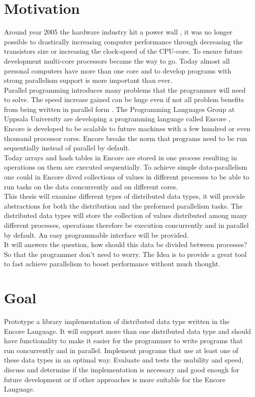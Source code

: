 \section{Motivation}
Around year 2005 the hardware industry hit a power wall \cite{powerwall}, it was no longer possible to drastically increasing computer performance through decreasing the transistors size or increasing the clock-speed of the CPU-core. To ensure future development multi-core processors became the way to go. Today almost all personal computers have more than one core and to develop programs with strong parallelism support is more important than ever.\\

Parallel programming introduces many problems that the programmer will need to solve. The speed increase gained can be huge even if not all problem benefits from being written in parallel form \cite{paralell-computing}. The Programming Languages Group at Uppsala University are developing a programming language called Encore \cite{encore_paper}, Encore is developed to be scalable to future machines with a few hundred or even thousand processor cores. Encore breaks the norm that programs need to be run sequentially instead of parallel by default. \\

Today arrays and hash tables in Encore are stored in one process resulting in operations on them are executed sequentially. To achieve simple data-parallelism \cite{paralell-computing} one could in Encore dived collections of values in different processes to be able to run tasks on the data concurrently and on different cores.\\

This thesis will examine different types of distributed data types, it will provide abstractions for both the distribution and the preformed parallelism tasks. The distributed data types will store the collection of values distributed among many different processes, operations therefore be execution concurrently and in parallel by default. An easy programmable interface will be provided.\\

It will answers the question, how should this data be divided between processes? So that the programmer don’t need to worry. The Idea is to provide a great tool to fast achieve parallelism to boost performance without much thought. \\

\section{Goal}
Prototype a library implementation of distributed data type written in the Encore Language. It will support more than one distributed data type and should have functionality to make it easier for the programmer to write programs that run concurrently and in parallel. Implement programs that use at least one of these data types in an optimal way. Evaluate and tests the usability and speed, discuss and determine if the implementation is necessary and good enough for future development or if other approaches is more suitable for the Encore Language. 